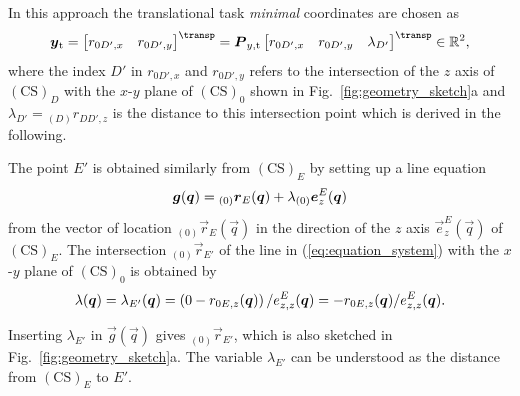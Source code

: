 \documentclass[graybox,vecphys]{svmult}
\newcommand{\ks}[1]{{(\mathrm{CS})_{#1}}}
\begin{document}
In this approach the translational task \emph{minimal} coordinates are chosen as 
%
\vspace{-0.1cm}
\begin{equation}
\label{eq:minimalkoordinaten_2T}
\vec{y}_{\mathrm{t}}
=
\begin{bmatrix}
r_{0D',x}  & r_{0D',y}
\end{bmatrix}^\transp
=
\vec{P}_{y,\mathrm{t}}
\begin{bmatrix}
r_{0D',x} & 
r_{0D',y} & 
{\lambda_{D'}}
\end{bmatrix}^\transp
\in {\mathbb{R}}^{2},
\vspace{-0.1cm}
\end{equation}
%
where the index $D'$ in $r_{0D',x}$ and $r_{0D',y}$ refers to the intersection of the $z$ axis of $\ks{D}$ with the $x$-$y$ plane of $\ks{0}$ shown in Fig.~\ref{fig:geometry_sketch}a and $\lambda_{D'} = {_{(D)}r_{DD',z}}$ is the distance to this intersection point which is derived in the following. 

The point $E'$ is obtained similarly from $\ks{E}$ by setting up a line equation %
%
\vspace{-0.1cm}
\begin{equation}
\label{eq:equation_system}
{\vec{g}(\vec{q})}
={_{(0)}\vec{r}_E(\vec{q})}+ {\lambda{_{(0)}\vec{e}_{z}^{E}}(\vec{q})}
\vspace{-0.1cm}
\end{equation}
%
from the vector of location ${_{(0)}\vec{r}_E(\vec{q})}$ in the direction of the $z$ axis $\vec{e}_{z}^{E}(\vec{q})$ of $\ks{E}$.
%
The intersection
${_{(0)}\vec{r}_{E'}}
$
of the line in (\ref{eq:equation_system}) with the $x$-$y$ plane of $\ks{0}$ is obtained by
%
\vspace{-0.1cm}
\begin{equation}
\label{eq:lambda_Edash}
{\lambda(\vec{q})} 
= 
{\lambda_{E'}(\vec{q})} 
= 
\left(0 - r_{0E,z}(\vec{q})\right)/{e_{z,z}^E}(\vec{q}) 
= 
-r_{0E,z}(\vec{q}) / e_{z,z}^E(\vec{q}).
\vspace{-0.1cm}
\end{equation}

Inserting ${\lambda_{E'}}$ in $\vec{g}(\vec{q})$ gives ${_{(0)}\vec{r}_{E'}}$, which is also sketched in Fig.~\ref{fig:geometry_sketch}a.
The variable ${\lambda_{E'}}$ can be understood as the distance from $\ks{E}$ to $E'$. 

\end{document}
